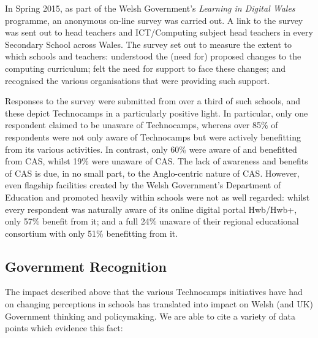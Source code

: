 \documentclass[conference]{IEEEtran}
\begin{document}
In Spring 2015, as part of the Welsh Government's
\emph{Learning in Digital Wales} programme,
an anonymous on-line survey was carried out.
A link to the survey %
was sent out to head teachers and ICT/Computing subject head teachers
in every Secondary School across Wales.
The survey set out to measure the extent to which schools and teachers:
understood the (need for) proposed changes to the computing curriculum;
felt the need for support to face these changes;
and recognised the various organisations that were
providing such support.

Responses to the survey were submitted from over a third of such
schools, and these depict Technocamps in a particularly positive
light.  In particular, only one respondent claimed to be unaware of
Technocamps, whereas over 85\% of respondents were not only aware of
Technocamps but were actively benefitting from its various activities.
In contrast, only 60\% were aware of and benefitted from CAS, whilst
19\% were unaware of CAS. The lack of awareness and benefits of CAS is
due, in no small part, to the Anglo-centric nature of CAS.  However,
even flagship facilities created by the Welsh Government's Department
of Education and promoted heavily within schools were not as well
regarded: whilst every respondent was naturally aware of its online
digital portal Hwb/Hwb+, only 57\% benefit from it; and a full 24\%
unaware of their regional educational consortium with only 51\%
benefitting from it.

\subsection{Government Recognition}
\label{govrecog}

The impact described above that the various Technocamps initiatives
have had on changing perceptions in schools has translated into impact
on Welsh (and UK) Government thinking and policymaking.
We are able to cite a variety of data points
which evidence this fact:
\end{document}
